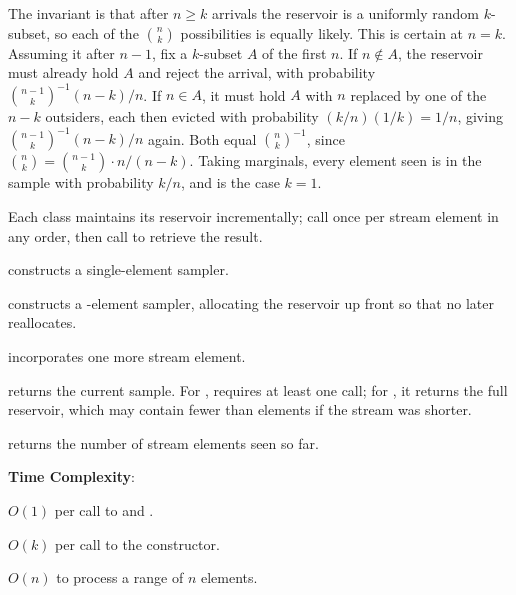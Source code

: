 The invariant is that after $n \geq k$ arrivals the reservoir is a uniformly random $k$-subset, so each of the $\binom{n}{k}$ possibilities is equally likely. This is certain at $n = k$. Assuming it after $n - 1$, fix a $k$-subset $A$ of the first $n$. If $n \notin A$, the reservoir must already hold $A$ and reject the arrival, with probability $\binom{n-1}{k}^{-1}(n-k)/n$. If $n \in A$, it must hold $A$ with $n$ replaced by one of the $n - k$ outsiders, each then evicted with probability $(k/n)(1/k) = 1/n$, giving $\binom{n-1}{k}^{-1}(n-k)/n$ again. Both equal $\binom{n}{k}^{-1}$, since $\binom{n}{k} = \binom{n-1}{k} \cdot n/(n-k)$. Taking marginals, every element seen is in the sample with probability $k/n$, and  is the case $k = 1$.

Each class maintains its reservoir incrementally; call  once per stream element in any order, then call  to retrieve the result.

\begin{compactitem}
  \item {} constructs a single-element sampler.
  \item {} constructs a -element sampler, allocating the reservoir up front so that no later  reallocates.
  \item {} incorporates one more stream element.
  \item {} returns the current sample. For ,  requires at least one  call; for , it returns the full reservoir, which may contain fewer than  elements if the stream was shorter.
  \item {} returns the number of stream elements seen so far.
\end{compactitem}

\textbf{Time Complexity}:
\begin{compactitem}
  \item $O(1)$ per call to  and .
  \item $O(k)$ per call to the  constructor.
  \item $O(n)$ to process a range of $n$ elements.
\end{compactitem}

